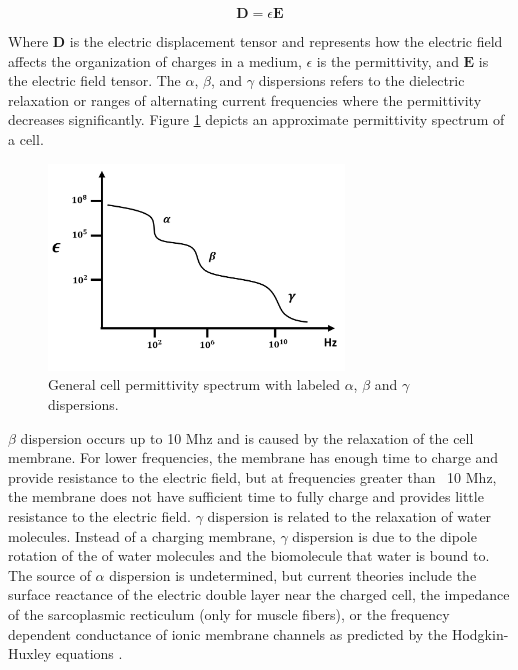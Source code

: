  \begin{equation}
     \textbf{D} = \epsilon \textbf{E}
 \end{equation}
 
 \noindent Where $\textbf{D}$ is the electric displacement tensor and represents how the electric field affects the organization of charges in a medium, $\epsilon$ is the permittivity, and $\textbf{E}$ is the electric field tensor. The $\alpha$, $\beta$, and $\gamma$ dispersions refers to the dielectric relaxation or ranges of alternating current frequencies where the permittivity decreases significantly. Figure \ref{fig:schwan_dispersions} depicts an approximate permittivity spectrum of a cell.
 
 \begin{figure}[ht]
 \centering
 \includegraphics[width=0.7\textwidth]{images/schwanDispersions.png}
 \caption[General cell permittivity spectrum]{General cell permittivity spectrum with labeled $\alpha$, $\beta$ and $\gamma$ dispersions.}
 \label{fig:schwan_dispersions}
 \end{figure}
 
 \noindent $\beta$ dispersion occurs up to 10 Mhz and is caused by the relaxation of the cell membrane. For lower frequencies, the membrane has enough time to charge and provide resistance to the electric field, but at frequencies greater than ~10 Mhz, the membrane does not have sufficient time to fully charge and provides little resistance to the electric field. $\gamma$ dispersion is related to the relaxation of water molecules. Instead of a charging membrane, $\gamma$ dispersion is due to the dipole rotation of the of water molecules and the biomolecule that water is bound to. The source of $\alpha$ dispersion is undetermined, but current theories include the surface reactance of the electric double layer near the charged cell, the impedance of the sarcoplasmic recticulum (only for muscle fibers), or the frequency dependent conductance of ionic membrane channels as predicted by the Hodgkin-Huxley equations \cite{schwan_electrical_1994}.
 
